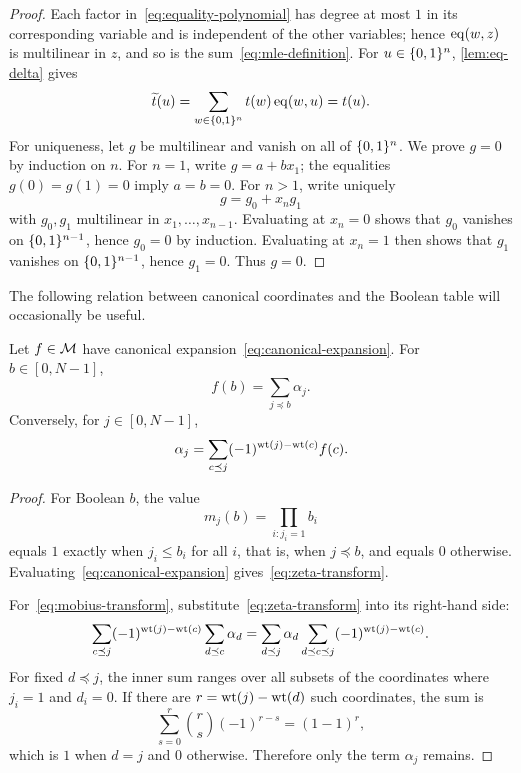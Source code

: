 \begin{proof}
Each factor in~\eqref{eq:equality-polynomial} has degree at most $1$ in its corresponding variable and is independent of the other variables; hence $\operatorname{eq}(w,z)$ is multilinear in $z$, and so is the sum~\eqref{eq:mle-definition}.  For $u\in\{0,1\}^n$, \cref{lem:eq-delta} gives
\[
  \widetilde t(u)
  =\sum_{w\in\{0,1\}^n}t(w)\operatorname{eq}(w,u)
  =t(u).
\]
For uniqueness, let $g$ be multilinear and vanish on all of $\{0,1\}^n$.  We prove $g=0$ by induction on $n$.  For $n=1$, write $g=a+bx_1$; the equalities $g(0)=g(1)=0$ imply $a=b=0$.  For $n>1$, write uniquely
\[
  g=g_0+x_ng_1
\]
with $g_0,g_1$ multilinear in $x_1,\ldots,x_{n-1}$.  Evaluating at $x_n=0$ shows that $g_0$ vanishes on $\{0,1\}^{n-1}$, hence $g_0=0$ by induction.  Evaluating at $x_n=1$ then shows that $g_1$ vanishes on $\{0,1\}^{n-1}$, hence $g_1=0$.  Thus $g=0$.
\end{proof}

The following relation between canonical coordinates and the Boolean table will occasionally be useful.

\begin{lemma}
\label{lem:mobius}
Let $f\in\mathcal{M}$ have canonical expansion~\eqref{eq:canonical-expansion}.  For $b\in[0,N-1]$,
\begin{equation}
  f(b)=\sum_{j\preceq b}\alpha_j.
  \label{eq:zeta-transform}
\end{equation}
Conversely, for $j\in[0,N-1]$,
\begin{equation}
  \alpha_j
  =\sum_{c\preceq j}(-1)^{\operatorname{wt}(j)-\operatorname{wt}(c)}f(c).
  \label{eq:mobius-transform}
\end{equation}
\end{lemma}

\begin{proof}
For Boolean $b$, the value
\[
  m_j(b)=\prod_{i:j_i=1}b_i
\]
equals $1$ exactly when $j_i\le b_i$ for all $i$, that is, when $j\preceq b$, and equals $0$ otherwise.  Evaluating~\eqref{eq:canonical-expansion} gives~\eqref{eq:zeta-transform}.

For~\eqref{eq:mobius-transform}, substitute~\eqref{eq:zeta-transform} into its right-hand side:
\[
  \sum_{c\preceq j}(-1)^{\operatorname{wt}(j)-\operatorname{wt}(c)}
  \sum_{d\preceq c}\alpha_d
  =
  \sum_{d\preceq j}\alpha_d
  \sum_{d\preceq c\preceq j}
  (-1)^{\operatorname{wt}(j)-\operatorname{wt}(c)}.
\]
For fixed $d\preceq j$, the inner sum ranges over all subsets of the coordinates where $j_i=1$ and $d_i=0$.  If there are $r=\operatorname{wt}(j)-\operatorname{wt}(d)$ such coordinates, the sum is
\[
  \sum_{s=0}^{r}\binom{r}{s}(-1)^{r-s}=(1-1)^r,
\]
which is $1$ when $d=j$ and $0$ otherwise.  Therefore only the term $\alpha_j$ remains.
\end{proof}

